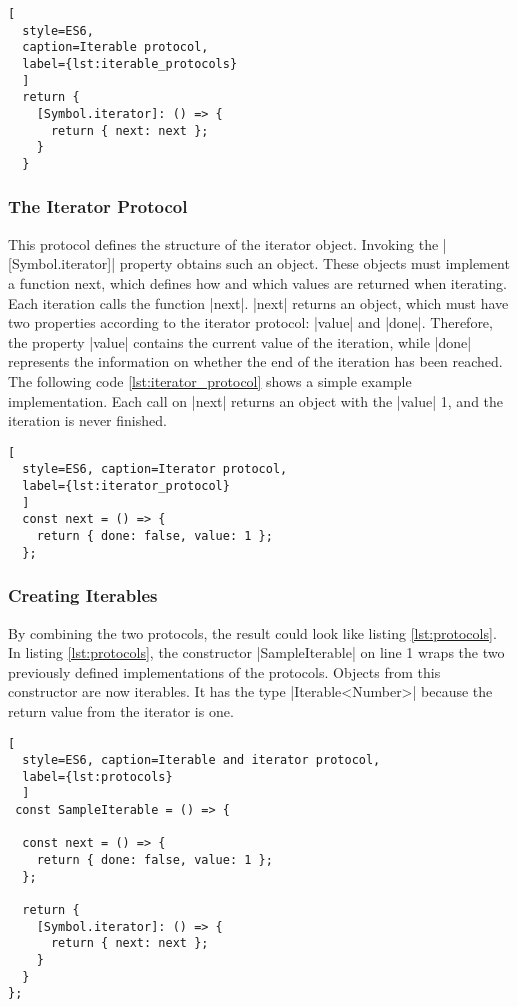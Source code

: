 \begin{lstlisting}[
  style=ES6, 
  caption=Iterable protocol,
  label={lst:iterable_protocols}
  ]
  return {
    [Symbol.iterator]: () => {
      return { next: next };
    }
  }
\end{lstlisting}

\subsubsection{The Iterator Protocol}
\label{subsub:The Iterator Protocol}
This protocol defines the structure of the iterator object. Invoking the 
|[Symbol.iterator]| property obtains such an object. These objects must 
implement a function next, which defines how and which values are returned 
when iterating.
Each iteration calls the function |next|. |next| returns an object, which must
have two properties according to the iterator protocol: |value| and |done|.
Therefore, the property |value| contains the current value of the iteration,
while |done| represents the information on whether the end of the iteration has 
been reached. The following code \ref{lst:iterator_protocol} shows a simple 
example implementation. Each call on |next| returns an object with the |value| 
1, and the iteration is never finished. 

\begin{lstlisting}[
  style=ES6, caption=Iterator protocol,
  label={lst:iterator_protocol}
  ]
  const next = () => {
    return { done: false, value: 1 };
  };
\end{lstlisting}

\subsubsection{Creating Iterables}
\label{subsub:Creating Iterables}
By combining the two protocols, the result could look like listing
\ref{lst:protocols}. In listing \ref{lst:protocols}, the constructor 
|SampleIterable| on line 1 wraps the two previously
defined implementations of the protocols. Objects from this constructor are now
iterables. It has the type |Iterable<Number>| because the return value from the
iterator is one.

\begin{lstlisting}[
  style=ES6, caption=Iterable and iterator protocol,
  label={lst:protocols}
  ]
 const SampleIterable = () => {

  const next = () => {
    return { done: false, value: 1 };
  };

  return {
    [Symbol.iterator]: () => {
      return { next: next };
    }
  }
};
\end{lstlisting}

